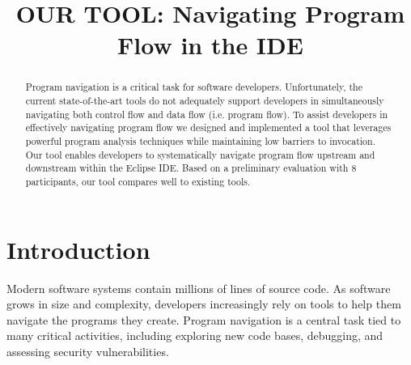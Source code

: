 \documentclass[conference]{IEEEtran}
\newcommand{\toolName}{OUR TOOL}
\begin{document}
%
\title{\toolName: Navigating Program Flow in the IDE}


\author{
}

\maketitle

\begin{abstract}
Program navigation is a critical task for software developers. 
Unfortunately, the current state-of-the-art tools do not adequately support developers in simultaneously navigating both control flow and data flow (i.e. program flow). 
To assist developers in effectively navigating program flow we designed and implemented a tool that leverages powerful program analysis techniques while maintaining low barriers to invocation.
Our tool enables developers to systematically navigate program flow upstream and downstream within the Eclipse IDE.
Based on a preliminary evaluation with 8 participants, our tool compares well to existing tools. 
\end{abstract}




\IEEEpeerreviewmaketitle


\section{Introduction}
%
Modern software systems contain millions of lines of source code. 
As software grows in size and complexity, developers increasingly rely on tools to help them navigate the programs they create. 
Program navigation is a central task tied to many critical activities, including exploring new code bases, debugging, and assessing security vulnerabilities. 
\end{document}
